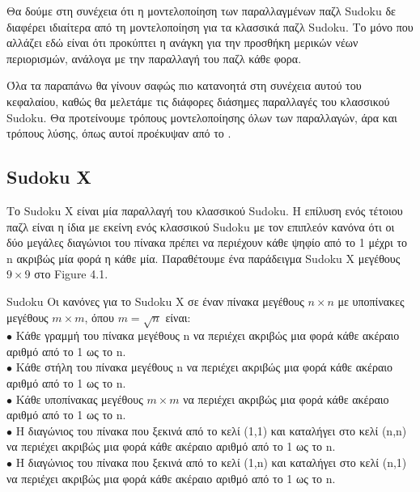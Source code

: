 \documentclass[oneside,12pt]{book}
\theoremstyle{definition}
\begin{document}
Θα δούμε στη συνέχεια ότι η μοντελοποίηση των παραλλαγμένων παζλ Sudoku δε διαφέρει ιδιαίτερα από τη μοντελοποίηση για τα κλασσικά παζλ Sudoku. Το μόνο που αλλάζει εδώ είναι ότι προκύπτει η ανάγκη για την προσθήκη μερικών νέων περιορισμών, ανάλογα με την παραλλαγή του παζλ κάθε φορα. \par

Όλα τα παραπάνω θα γίνουν σαφώς πιο κατανοητά στη συνέχεια αυτού του κεφαλαίου, καθώς θα μελετάμε τις διάφορες διάσημες παραλλαγές του κλασσικού Sudoku. Θα προτείνουμε τρόπους μοντελοποίησης όλων των παραλλαγών, άρα και τρόπους λύσης, όπως αυτοί προέκυψαν από το \cite{3}.

\subsection{Sudoku X}

Το Sudoku X είναι μία παραλλαγή του κλασσικού Sudoku. Η επίλυση ενός τέτοιου παζλ είναι η ίδια με εκείνη ενός κλασσικού Sudoku με τον επιπλεόν κανόνα ότι οι δύο μεγάλες διαγώνιοι του πίνακα πρέπει να περιέχουν κάθε ψηφίο από το 1 μέχρι το n ακριβώς μία φορά η κάθε μία. Παραθέτουμε ένα παράδειγμα Sudoku X μεγέθους \(9 \times 9 \) στο Figure 4.1.\par

\begin{mytheorem}{Sudoku}{}
	Οι κανόνες για το Sudoku X σε έναν πίνακα μεγέθους \(n \times n\) με υποπίνακες μεγέθους \(m \times m\), 	όπου \(m = \sqrt{n}\) είναι: \\
	\(\bullet\) Κάθε γραμμή του πίνακα μεγέθους n να περιέχει ακριβώς μια φορά κάθε ακέραιο αριθμό από το 1 ως το n. \\
	\(\bullet\) Κάθε στήλη του πίνακα μεγέθους n να περιέχει ακριβώς μια φορά κάθε ακέραιο αριθμό από το 1 ως το n. \\
	\(\bullet\) Κάθε υποπίνακας μεγέθους \(m \times m\) να περιέχει ακριβώς μια φορά κάθε ακέραιο αριθμό από το 1 ως το n. \\
	\(\bullet\) Η διαγώνιος του πίνακα που ξεκινά από το κελί (1,1) και καταλήγει στο κελί (n,n) να περιέχει ακριβώς μια φορά κάθε ακέραιο αριθμό από το 1 ως το n. \\
	\(\bullet\) Η διαγώνιος του πίνακα που ξεκινά από το κελί (1,n) και καταλήγει στο κελί (n,1) να περιέχει ακριβώς μια φορά κάθε ακέραιο αριθμό από το 1 ως το n. \\

\end{mytheorem}
\end{document}
